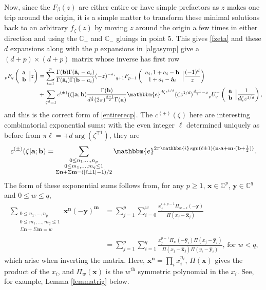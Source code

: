 \documentclass[12pt]{article}
\newcommand{\ee}[0] {\mathbbm{e}}
\newcommand{\ii}[0] {\mathbbm{i}}
\numberwithin{equation}{section}
\newcommand{\FF}[6] {{}_{#1}{#2}_{#3} \left( \begin{array}{c} #4 \\ #5 \end{array} \Big| {#6}  \right)}
\newcommand{\FFe}[7] {{}_{#1}^{\,}{#2}_{#3}^{#4} \left( \begin{array}{c} #5 \\ #6 \end{array} \Big| {#7} \right)}
\newcommand{\bfa}[0] {\mathbf{a}}
\newcommand{\bfb}[0] {\mathbf{b}}
\newcommand{\bfm}[0] {\mathbf{m}}
\newcommand{\bfn}[0] {\mathbf{n}}
\newcommand{\bfx}[0] {\mathbf{x}}
\newcommand{\bfy}[0] {\mathbf{y}}
\begin{document}
Now, since the $F_{\beta}(z)$ are either entire or have simple prefactors as $z$ makes one trip around the origin, it is a simple matter to transform these minimal solutions back to an arbitrary $f_{\zeta}(z)$ by moving $z$ around the origin a few times in either direction and using the $\mathbb{C}_{+}$ and $\mathbb{C}_{-}$ gluings in point 5. This gives \eqref{fzeta} and these $d$ expansions along with the $p$ expansions in \eqref{algasymp} give a $(d+p)\times(d+p)$ matrix whose inverse has first row
\begin{equation}
\label{entirerecp2}
\begin{alignedat}{1}
\FF{p}{F}{q}{\mathbf{a}}{\mathbf{b}}{z}&=\sum_{i=1}^{p} \frac{\Gamma(\mathbf{b}) \Gamma(\hat{\mathbf{a}}_i-a_i)}{\Gamma(\hat{\mathbf{a}}_i)\Gamma(\mathbf{b}-a_i)} (-z)^{-a_i} \FFe{q+1}{F}{p-1}{-}{a_i,1+a_i-\mathbf{b}}{1+a_i-\hat{\mathbf{a}}_i}{\frac{(-1)^d}{z}}\\
&+\sum_{\zeta^d=1} c^{(\pm)} (\zeta |\bfa; \bfb) \frac{\Gamma(\mathbf{b})}{d^{\frac{1}{2}} (2 \pi )^{\frac{d-1}{2}} \Gamma(\mathbf{a})} \ee^{d \zeta z^{1/d}}(\zeta z^{1/d})^{\frac{d-1}{2}-\sigma} \FFe{p}{U}{q}{-}{\bfa}{\bfb}{\frac{1}{d\zeta z^{1/d}}}\text{,}
\end{alignedat}
\end{equation}
and this is the correct form of \eqref{entirerecp}. The $c^{(\pm)}(\zeta)$ here are interesting combinatorial exponential sums: with the even integer $\ell$ determined uniquely as before from $\pi \ell = \mp d \arg(\zeta^{\mp1})$, they are
\begin{equation}
\label{equ_czeta}
c^{(\pm)} (\zeta |\bfa; \bfb) =\sum_{\substack{0 \le n_1, \dots, n_p \\ 0 \le m_1, \dots, m_q \le 1 \\ \Sigma \bfn + \Sigma \bfm = (|\ell \pm 1|-1)/2}}{ \ee^{2\pi \ii \operatorname{sgn}\left(\ell\pm 1\right) (\bfn \cdot \bfa + \mathbf{m} \cdot (\bfb + \frac{1}{2}))}}\text{.}
\end{equation}
The form of these exponential sums follows from, for any $p \ge 1$, $\bfx \in \mathbb{C}^p$, $\bfy \in \mathbb{C}^q$ and $0 \le w \le q$,
\begin{align*}
\sum_{\substack{0 \le n_1, \dots, n_p \\ 0 \le m_1, \dots, m_q \le 1 \\ \Sigma \bfn + \Sigma \bfm = w}}{ \bfx^\bfn (-\bfy)^\bfm} &= \sum_{j=1}^{p}\sum_{i=0}^{w} \frac{x_j^{i+p-1} \Pi_{w-i}(-\bfy)}{\Pi (x_j-\hat{\bfx}_j)}\\
&=\sum_{j=1}^{p} \sum_{i=1}^{q} \frac{x_j^{p-1} \Pi_w(-\hat{\bfy}_i) \Pi(x_j-\hat{\bfy}_i)}{\Pi(x_j - \hat{\bfx}_j) \Pi (y_i-\hat{\bfy}_i)}\text{, for } w < q\text{,}
\end{align*}
which arise when inverting the matrix. Here, $\bfx^{\bfn} = \prod_i x_i^{n_i}$, $\Pi(\bfx)$ gives the product of the $x_i$, and $\Pi_w(\bfx)$ is the $w^{\text{th}}$ symmetric polynomial in the $x_i$. See, for example, Lemma \ref{lemmatrig} below.
\end{document}
